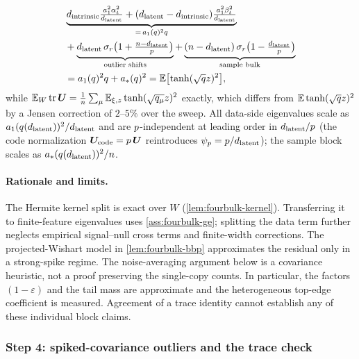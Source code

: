 \begin{remark}
\begin{equation}
\begin{aligned}
&\underbrace{d_{\mathrm{intrinsic}}\tfrac{a_1^2\alpha_t^2}{d_{\mathrm{latent}}}+(d_{\mathrm{latent}}-d_{\mathrm{intrinsic}})\tfrac{a_1^2\beta_t^2}{d_{\mathrm{latent}}}}_{=\,a_1(q)^2q}
  \\ &+\underbrace{d_{\mathrm{latent}}\,\sigma_r\bigl(1+\tfrac{n-d_{\mathrm{latent}}}{p}\bigr)}_{\text{outlier shifts}}+\underbrace{(n-d_{\mathrm{latent}})\,\sigma_r\bigl(1-\tfrac{d_{\mathrm{latent}}}{p}\bigr)}_{\text{sample bulk}}
  \\ & =a_1(q)^2q+a_*(q)^2=\mathbb{E}\bigl[\tanh(\sqrt q z)^2\bigr],
\end{aligned}
\end{equation}
while $\mathbb{E}_W\operatorname{tr}\bm{U}=\tfrac1{n}\sum_\mu\mathbb{E}_{\xi,z}\tanh(\sqrt{q_\mu}z)^2$ exactly, which differs from $\mathbb{E}\tanh(\sqrt qz)^2$ by a Jensen correction of $2$--$5\%$ over the sweep. All data-side eigenvalues scale as $a_1(q(d_{\mathrm{latent}}))^2/d_{\mathrm{latent}}$ and are $p$-independent at leading order in $d_{\mathrm{latent}}/p$ (the code normalization $\bm{U}_{\mathrm{code}}=p\,\bm{U}$ reintroduces $\psi_p=p/d_{\mathrm{latent}}$); the sample block scales as $a_*(q(d_{\mathrm{latent}}))^2/n$.
\end{remark}
\paragraph{Rationale and limits.}
The Hermite kernel split is exact over $W$ (\cref{lem:fourbulk-kernel}). Transferring it to finite-feature eigenvalues uses \cref{ass:fourbulk-ge}; splitting the data term further neglects empirical signal--null cross terms and finite-width corrections. The projected-Wishart model in \cref{lem:fourbulk-bbp} approximates the residual only in a strong-spike regime. The noise-averaging argument below is a covariance heuristic, not a proof preserving the single-copy counts. In particular, the factors $(1-\varepsilon)$ and the tail mass are approximate and the heterogeneous top-edge coefficient is measured. Agreement of a trace identity cannot establish any of these individual block claims.


\subsubsection{Step 4: spiked-covariance outliers and the trace check}

